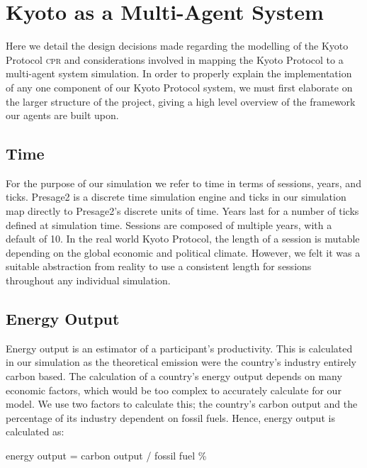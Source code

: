 \section{Kyoto as a Multi-Agent System}

Here we detail the design decisions made regarding the modelling of the Kyoto Protocol \textsc{cpr} and considerations involved in mapping the Kyoto Protocol to a multi-agent system simulation. In order to properly explain the implementation of any one component of our Kyoto Protocol system, we must first elaborate on the larger structure of the project, giving a high level overview of the framework our agents are built upon.

\subsection{Time}

For the purpose of our simulation we refer to time in terms of sessions, years, and ticks. Presage2 is a discrete time simulation engine and ticks in our simulation map directly to Presage2's discrete units of time. Years last for a number of ticks defined at simulation time. Sessions are composed of multiple years, with a default of 10. In the real world Kyoto Protocol, the length of a session is mutable depending on the global economic and political climate. However, we felt it was a suitable abstraction from reality to use a consistent length for sessions throughout any individual simulation.

\subsection{Energy Output}

Energy output is an estimator of a participant's productivity. This is calculated in our simulation as the theoretical \CO emission were the country's industry entirely carbon based. The calculation of a country's energy output depends on many economic factors, which would be too complex to accurately calculate for our model. We use two factors to calculate this; the country's carbon output and the percentage of its industry dependent on fossil fuels. Hence, energy output is calculated as: 

%
%

\begin{center}
energy output = carbon output / fossil fuel \%
\end{center}

